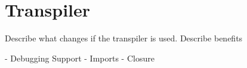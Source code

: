 \section{Transpiler}\label{sec:transpiler}

Describe what changes if the transpiler is used. Describe benefits

- Debugging Support
- Imports
- Closure